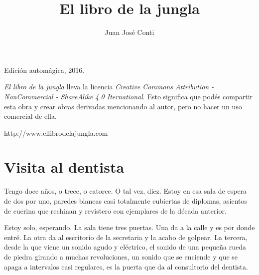 \documentclass[11pt,twoside,openright]{book}
\title{El libro de la jungla}
\author{Juan José Conti}
\date{}
\begin{document}

\pagestyle{plain}


%
%

\maketitle

\cleardoublepage

\thispagestyle{empty}
\noindent
Edición automágica, 2016.\\

\vspace{0.5cm}

\noindent
\emph{El libro de la jungla} lleva la licencia
\emph{Creative Commons Attribution - NonCommercial - ShareAlike 4.0 Iternational}.
Esto significa que podés compartir esta obra y crear obras derivadas
mencionando al autor, pero no ha\-cer un uso comercial de ella.

\vfill

\noindent
http://www.ellibrodelajungla.com\\

\cleardoublepage


\renewcommand*\contentsname{Índice}

\tableofcontents

\cleardoublepage





\chapter*{Visita al dentista}  
 Tengo doce años, o trece, o catorce. O tal vez, diez. Estoy en esa sala de
 espera de dos por uno, paredes blancas casi totalmente cubiertas de diplomas,
 asientos de cuerina que rechinan y revistero con ejemplares de la década
 anterior.
 
 Estoy solo, esperando. La sala tiene tres puertas. Una da a la calle y es por
 donde entré. La otra da al escritorio de la secretaria y la acabo de golpear.
 La tercera, desde la que viene un sonido agudo y eléctrico, el sonido de una
 pequeña rueda de piedra girando a muchas revoluciones, un sonido que se
 enciende y que se apaga a intervalos casi regulares, es la puerta que da al
 consultorio del dentista.
 
\end{document}
